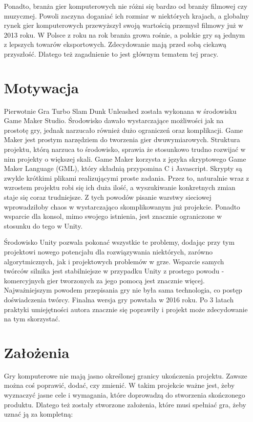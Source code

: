 \documentclass[a4paper,12pt,twoside,openany]{report}
\begin{document}
Ponadto, branża gier komputerowych nie różni się bardzo od branży filmowej czy muzycznej. Powoli zaczyna doganiać ich rozmiar w niektórych krajach, a globalny rynek gier komputerowych przewyższył swoją wartością przemysł filmowy już w 2013 roku. W Polsce z roku na rok branża growa rośnie, a polskie gry są jednym z lepszych towarów eksportowych\cite{canalplus_gry}. Zdecydowanie mają przed sobą ciekawą przyszłość. Dlatego też zagadnienie to jest głównym tematem tej pracy. 

\section{Motywacja}
Pierwotnie Gra Turbo Slam Dunk Unleashed została wykonana w środowisku Game Maker Studio. Środowisko dawało wystarczające możliwości jak na prostotę gry, jednak narzucało również dużo ograniczeń oraz komplikacji. Game Maker jest prostym narzędziem do tworzenia gier dwuwymiarowych. Struktura projektu, którą narzuca to środowisko, sprawia że stosunkowo trudno rozwijać w nim projekty o większej skali. Game Maker korzysta z języka skryptowego Game Maker Language (GML), który składnią przypomina C i Javascript. Skrypty są zwykle krótkimi plikami realizującymi proste zadania. Przez to, naturalnie wraz z wzrostem projektu robi się ich duża ilość, a wyszukiwanie konkretnych zmian staje się coraz trudniejsze. Z tych powodów pisanie warstwy sieciowej wprowadziłoby chaos w wystarczająco skomplikowanym już projekcie.  Ponadto wsparcie dla konsol, mimo swojego istnienia, jest znacznie ograniczone w stosunku do tego w Unity.

Środowisko Unity pozwala pokonać wszystkie te problemy, dodając przy tym projektowi nowego potencjału dla rozwiązywania niektórych, zarówno algorytmicznych, jak i projektowych problemów w grze. Wsparcie samych twórców silnika jest stabilniejsze w przypadku Unity z prostego powodu - komercyjnych gier tworzonych za jego pomocą jest znacznie więcej. Najważniejszym powodem przepisania gry nie była sama technologia, co postęp doświadczenia twórcy. Finalna wersja gry powstała w 2016 roku. Po 3 latach praktyki umiejętności autora znacznie się poprawiły i projekt może zdecydowanie na tym skorzystać. 

\section{Założenia}
Gry komputerowe nie mają jasno określonej granicy ukończenia projektu. Zawsze można coś poprawić, dodać, czy zmienić. W takim projekcie ważne jest, żeby wyznaczyć jasne cele i wymagania, które doprowadzą do stworzenia skończonego produktu. Dlatego też zostały stworzone założenia, które musi spełniać gra, żeby uznać ją za kompletną:
\end{document}
